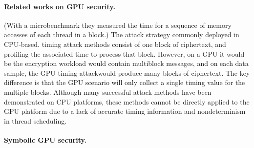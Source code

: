 \paragraph{Related works on GPU security.}
(With a microbenchmark they measured the
time for a sequence of memory accesses of each thread in a block.)
%
The attack strategy commonly deployed in CPU-based. timing attack methods consist of one block of ciphertext, and profiling the associated time to process that
block. However, on a GPU it would be the encryption workload would contain multiblock messages, and on each data sample, the GPU
timing attackwould produce many blocks of ciphertext.
The key difference is that the GPU scenario will only
collect a single timing value for the multiple blocks.
Although many successful attack methods have been
demonstrated on CPU platforms, these methods cannot be directly applied to the GPU platform due to a
lack of accurate timing information and nondeterminism in thread scheduling.

\paragraph{Symbolic GPU security.}


